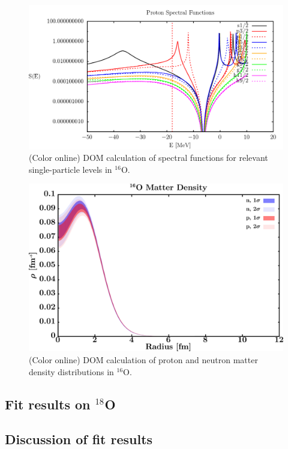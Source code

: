\documentclass[twocolumn,secnumarabic,amssymb, nobibnotes, aps, prl,
superscriptaddress, nobalancelastpage]{revtex4}
\begin{document}
\begin{figure}
    \includegraphics[scale=0.35]{figures/o16_protonSpectralFunctions.png}
    \caption{(Color online) DOM calculation of spectral functions for relevant
    single-particle levels in $^{16}$O.
}
    \label{O16_SpectralFunctions_DOMFit}
\end{figure}

\begin{figure}
    \includegraphics[scale=0.35]{figures/o16_matterDensity.png}
    \caption{(Color online) DOM calculation of proton and neutron matter density
        distributions in $^{16}$O.
    }
    \label{O16_MatterDensity_DOMFit}
\end{figure}


\subsection{Fit results on $^{18}$O}

\subsection{Discussion of fit results}
\end{document}
